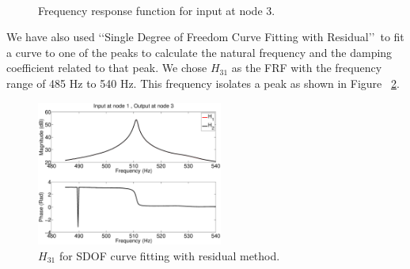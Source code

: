 \documentclass[paper=a4, fontsize=12pt]{scrartcl} %
\begin{document}
\begin{figure}[H]
	\centering
	\quad
	\\
	\caption{Frequency response function for input at node 3.}
	\label{fig:all_FRFs_3}
\end{figure}
%
We have also used \lq\lq Single Degree of Freedom Curve Fitting with Residual\rq\rq\ to fit a curve to one of the peaks to calculate the natural frequency and the damping coefficient related to that peak. We chose $H_{31}$ as the FRF with the frequency range of 485 Hz to 540 Hz. This frequency isolates a peak as shown in Figure ~\ref{fig:SDOFwR}.
%
\begin{figure}[H]
	\centering
	\includegraphics[height = 4.75cm]{H31_SDOF.eps}
	\caption{$H_{31}$ for SDOF curve fitting with residual method.}
	\label{fig:SDOFwR}
\end{figure}
\end{document}
